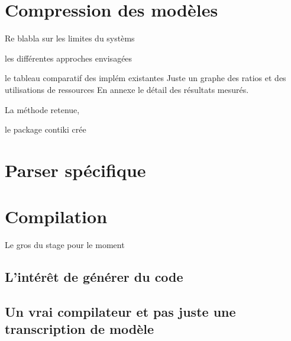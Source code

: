 \section{Compression des modèles}

Re blabla sur les limites du systèms

les différentes approches envisagées 

le tableau comparatif des implém existantes
Juste un graphe des ratios et des utilisations de ressources
En annexe le détail des résultats mesurés.


La méthode retenue,

le package contiki crée


\section{Parser spécifique}

\section{Compilation}

Le gros du stage pour le moment

\subsection{L'intérêt de générer du code}

\subsection{Un vrai compilateur et pas juste une transcription de modèle}